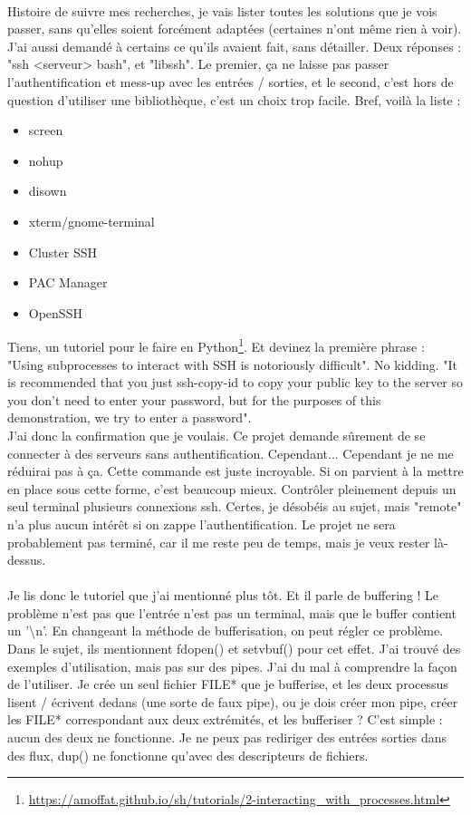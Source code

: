 \\Histoire de suivre mes recherches, je vais lister toutes les solutions que je vois passer, sans qu'elles soient forcément adaptées (certaines n'ont même rien à voir). J'ai aussi demandé à certains ce qu'ils avaient fait, sans détailler. Deux réponses : "ssh <serveur> bash", et "libssh". Le premier, ça ne laisse pas passer l'authentification et mess-up avec les entrées / sorties, et le second, c'est hors de question d'utiliser une bibliothèque, c'est un choix trop facile. Bref, voilà la liste :
\begin{itemize}
\item screen
\item nohup
\item disown
\item xterm/gnome-terminal
\item Cluster SSH
\item PAC Manager
\item OpenSSH
\\\end{itemize}
Tiens, un tutoriel pour le faire en Python\footnote{\url{https://amoffat.github.io/sh/tutorials/2-interacting_with_processes.html}}. Et devinez la première phrase : "Using subprocesses to interact with SSH is notoriously difficult". No kidding. "It is recommended that you just ssh-copy-id to copy your public key to the server so you don’t need to enter your password, but for the purposes of this demonstration, we try to enter a password".
\\J'ai donc la confirmation que je voulais. Ce projet demande sûrement de se connecter à des serveurs sans authentification. Cependant... Cependant je ne me réduirai pas à ça. Cette commande est juste incroyable. Si on parvient à la mettre en place sous cette forme, c'est beaucoup mieux. Contrôler pleinement depuis un seul terminal plusieurs connexions ssh. Certes, je désobéis au sujet, mais "remote" n'a plus aucun intérêt si on zappe l'authentification. Le projet ne sera probablement pas terminé, car il me reste peu de temps, mais je veux rester là-dessus.
\\\\
Je lis donc le tutoriel que j'ai mentionné plus tôt. Et il parle de buffering ! Le problème n'est pas que l'entrée n'est pas un terminal, mais que le buffer contient un '\textbackslash{n}'. En changeant la méthode de bufferisation, on peut régler ce problème. Dans le sujet, ils mentionnent fdopen() et setvbuf() pour cet effet. J'ai trouvé des exemples d'utilisation, mais pas sur des pipes. J'ai du mal à comprendre la façon de l'utiliser. Je crée un seul fichier FILE* que je bufferise, et les deux processus lisent / écrivent dedans (une sorte de faux pipe), ou je dois créer mon pipe, créer les FILE* correspondant aux deux extrémités, et les bufferiser ? C'est simple : aucun des deux ne fonctionne. Je ne peux pas rediriger des entrées sorties dans des flux, dup() ne fonctionne qu'avec des descripteurs de fichiers.
